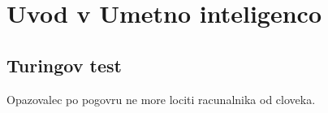 \section{Uvod v Umetno inteligenco}

\subsection{Turingov test}
Opazovalec po pogovru ne more lociti racunalnika od cloveka.\\
